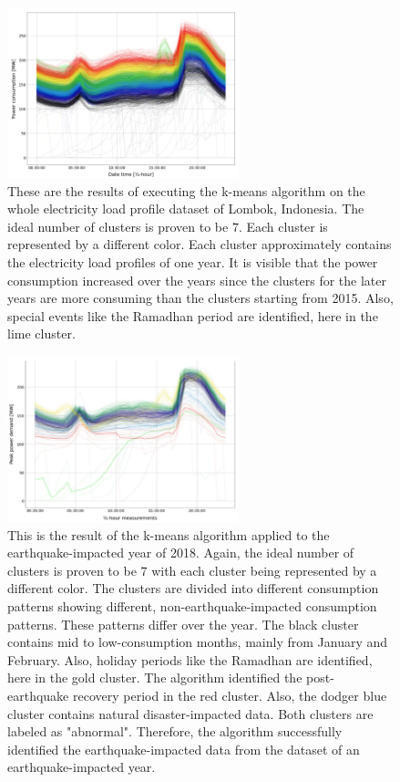 \begin{figure}[H]
    \centering
    \includegraphics[width=0.6\textwidth]{figures/jessen_ndImpactedClusters/jessen_wholeDataClustering.png}
    \caption{These are the results of executing the k-means algorithm on the whole electricity load profile dataset of Lombok, Indonesia.
    The ideal number of clusters is proven to be $7$.
    Each cluster is represented by a different color.
    Each cluster approximately contains the electricity load profiles of one year.
    It is visible that the power consumption increased over the years since the clusters for the later years are more consuming than the clusters starting from 2015.
    Also, special events like the Ramadhan period are identified, here in the lime cluster.
    }
    \label{fig:whole_data_clustering_results}
\end{figure}

\begin{figure}[H]
    \centering
    \includegraphics[width=0.6\textwidth]{figures/jessen_ndImpactedClusters/jessen_Clustering2018.png}
    \caption{This is the result of the k-means algorithm applied to the earthquake-impacted year of 2018.
    Again, the ideal number of clusters is proven to be $7$ with each cluster being represented by a different color.
    The clusters are divided into different consumption patterns showing different, non-earthquake-impacted consumption patterns.
    These patterns differ over the year.
    The black cluster contains mid to low-consumption months, mainly from January and February.
    Also, holiday periods like the Ramadhan are identified, here in the gold cluster.
    The algorithm identified the post-earthquake recovery period in the red cluster.
    Also, the dodger blue cluster contains natural disaster-impacted data.
    Both clusters are labeled as "abnormal".
    Therefore, the algorithm successfully identified the earthquake-impacted data from the dataset of an earthquake-impacted year.
    }
    \label{fig:clustering_results_2018}
\end{figure}

